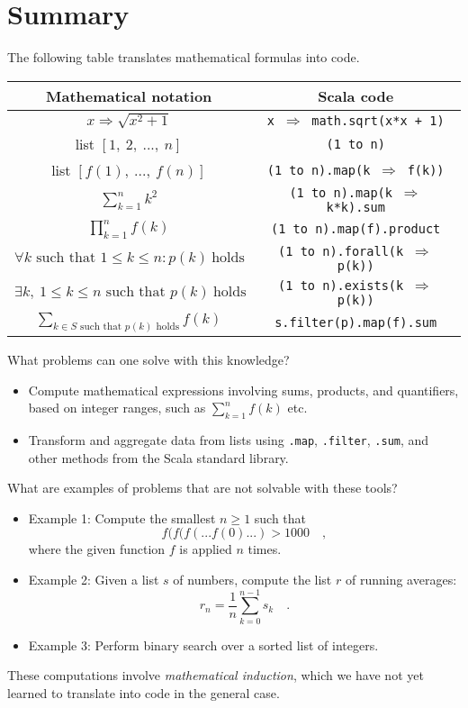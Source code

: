 \section{Summary}

The following table translates mathematical formulas into code.
\begin{center}
\begin{tabular}{|c|c|}
\hline 
\textbf{Mathematical notation} & \textbf{Scala code}\tabularnewline
\hline 
\hline 
$x\Rightarrow\sqrt{x^{2}+1}$ & \texttt{x $\Rightarrow$ math.sqrt(x{*}x + 1)}\tabularnewline
\hline 
list $\left[1,~2,~...,~n\right]$ & \texttt{(1 to n)}\tabularnewline
\hline 
list $\left[f(1),~...,~f(n)\right]$ & \texttt{(1 to n).map(k $\Rightarrow$ f(k))}\tabularnewline
\hline 
$\sum_{k=1}^{n}k^{2}$ & \texttt{(1 to n).map(k $\Rightarrow$ k{*}k).sum}\tabularnewline
\hline 
$\prod_{k=1}^{n}f(k)$ & \texttt{(1 to n).map(f).product}\tabularnewline
\hline 
$\forall k\text{ such that }1\leq k\leq n:p(k)~\text{holds}$ & \texttt{(1 to n).forall(k $\Rightarrow$ p(k))}\tabularnewline
\hline 
$\exists k,\:1\leq k\leq n\text{ such that }p(k)~\text{holds}$ & \texttt{(1 to n).exists(k $\Rightarrow$ p(k))}\tabularnewline
\hline 
${\displaystyle \sum_{k\in S\text{ such that }p(k)\text{ holds}}}f(k)$ & \texttt{s.filter(p).map(f).sum}\tabularnewline
\hline 
\end{tabular}
\par\end{center}

What problems can one solve with this knowledge?
\begin{itemize}
\item Compute mathematical expressions involving sums, products, and quantifiers,
based on integer ranges, such as $\sum_{k=1}^{n}f(k)$ etc.
\item Transform and aggregate data from lists using \lstinline!.map!, \lstinline!.filter!,\textbf{
}\lstinline!.sum!, and other methods from the Scala standard library.
\end{itemize}
What are examples of problems that are not solvable with these tools?
\begin{itemize}
\item Example 1: Compute the smallest $n\geq1$ such that 
\[
f(f(f(...f(0)...)>1000\quad,
\]
where the given function $f$ is applied $n$ times.
\item Example 2: Given a list $s$ of numbers, compute the list $r$ of
running averages: 
\[
r_{n}=\frac{1}{n}\sum_{k=0}^{n-1}s_{k}\quad.
\]
\item Example 3: Perform binary search over a sorted list of integers.
\end{itemize}
These computations involve \emph{mathematical induction},
which we have not yet learned to translate into code in the general
case.

